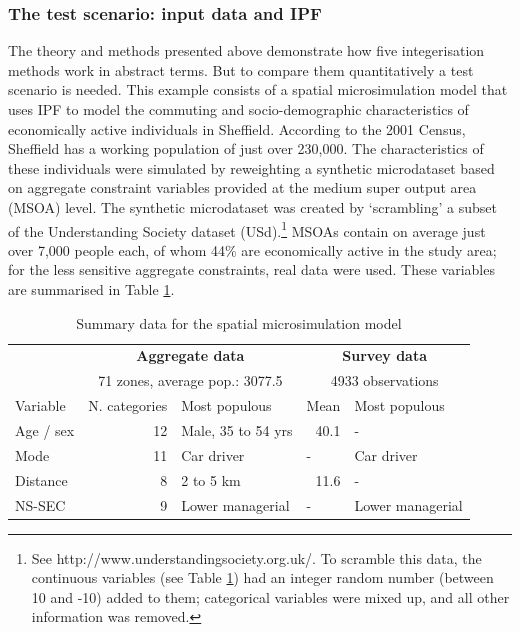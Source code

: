 \documentclass[a4paper, 11pt, twoside]{Thesis}
\begin{document}
\subsubsection{The test scenario: input data and IPF}
\label{worked-eg}
The theory and methods presented above demonstrate how five integerisation
methods work in abstract terms. But to compare them quantitatively a test
scenario is needed. This example consists of a spatial microsimulation model
that uses IPF to model the commuting and socio-demographic characteristics
of economically active individuals in
Sheffield. According to the 2001 Census, Sheffield has a working
population of just over 230,000. The characteristics of these
individuals were simulated by reweighting a synthetic microdataset based on
aggregate constraint variables provided at the medium super output area (MSOA)
level. The synthetic microdataset was created by `scrambling' a subset of the
Understanding Society dataset (USd).\footnote{See
http://www.understandingsociety.org.uk/. To scramble this data, the continuous
variables (see Table \ref{t:data}) had an integer random number (between 10 and
-10) added to them; categorical variables were mixed up, and all other
information was removed.} MSOAs
contain on average
just over 7,000 people each, of whom 44\% are economically active
in the study area; for the less sensitive aggregate constraints, real data were
used. These variables are summarised in Table \ref{t:data}.

\begin{table}[htbp]
\caption{Summary data for the spatial microsimulation model}
\begin{center}
\begin{tabular}{lrlll}
\toprule
 & \multicolumn{ 2}{c}{\textbf{Aggregate data}} & \multicolumn{
2}{c}{\textbf{Survey data}} \\
 & \multicolumn{ 2}{c}{71 zones, average pop.: 3077.5} & \multicolumn{
2}{c}{4933 observations} \\ \midrule
Variable & \multicolumn{1}{l}{N. categories} & Most populous  & Mean  &
Most populous \\ \hline
Age / sex  & 12 & Male, 35 to 54 yrs & \multicolumn{1}{r}{40.1} & - \\
Mode  & 11 & Car driver & - & Car driver \\
Distance  & 8 & 2 to 5 km & \multicolumn{1}{r}{11.6} & - \\
NS-SEC  & 9 & Lower managerial & - & Lower managerial \\ \bottomrule
\end{tabular}\end{center}
\label{t:data}
\end{table}
\end{document}
